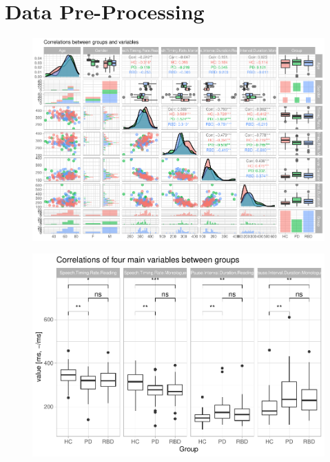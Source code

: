 \documentclass[
  english,
  doc,floatsintext]{apa6}
\begin{document}
\hypertarget{data-pre-processing}{%
\section{Data Pre-Processing}\label{data-pre-processing}}

\begin{figure}

{\centering \includegraphics{dap_report_anja_probst_files/figure-latex/intial-ggpairs-plot-1} 

}

\caption{ }\label{fig:intial-ggpairs-plot}
\end{figure}

\begin{figure}

{\centering \includegraphics{dap_report_anja_probst_files/figure-latex/boxplots-and-correlations-1} 

}

\caption{ }\label{fig:boxplots-and-correlations}
\end{figure}
\clearpage
\end{document}

